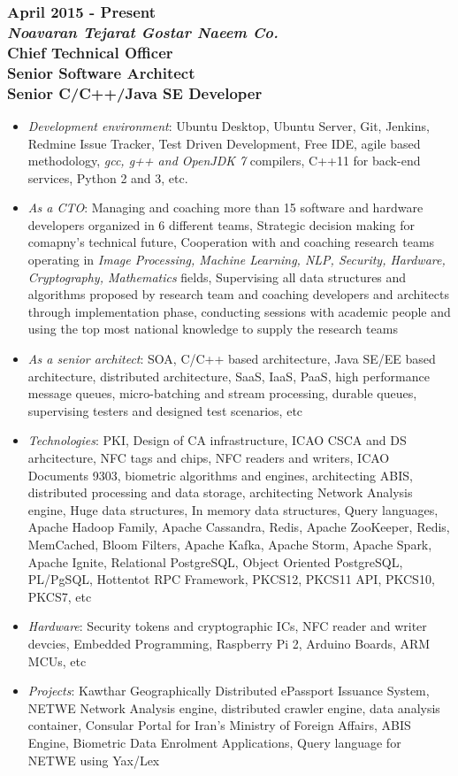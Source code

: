 \documentclass[10pt,a4paper]{article}
\begin{document}
\subsubsection{{April 2015 - Present} \\ \textnormal {\textit {Noavaran Tejarat Gostar Naeem Co.}} \\ {Chief Technical Officer \\ Senior Software Architect \\ Senior C/C++/Java SE Developer}}
  \setlength{\leftskip}{0.5cm}
  \setlength{\rightskip}{1cm}
  \begin{itemize}
    \setlength{\rightskip}{1cm}
    \setlength\itemsep{0em}
    \item \small \textit {Development environment}: Ubuntu Desktop, Ubuntu Server, Git, Jenkins, Redmine Issue Tracker, Test Driven Development, Free IDE, agile based methodology, \textit {gcc, g++ and OpenJDK 7} compilers, C++11 for back-end services, Python 2 and 3, etc.
    \item \small \textit {As a CTO}: Managing and coaching more than 15 software and hardware developers organized in 6 different teams, Strategic decision making for comapny's technical future, Cooperation with and coaching research teams operating in \textit {Image Processing, Machine Learning, NLP, Security, Hardware, Cryptography, Mathematics} fields, Supervising all data structures and algorithms proposed by research team and coaching developers and architects through implementation phase, conducting sessions with academic people and using the top most national knowledge to supply the research teams
    \item \small \textit {As a senior architect}: SOA, C/C++ based architecture, Java SE/EE based architecture, distributed architecture, SaaS, IaaS, PaaS, high performance message queues, micro-batching and stream processing, durable queues, supervising testers and designed test scenarios, etc
    \item \small \textit {Technologies}: PKI, Design of CA infrastructure, ICAO CSCA and DS arhcitecture, NFC tags and chips, NFC readers and writers, ICAO Documents 9303, biometric algorithms and engines, architecting ABIS, distributed processing and data storage, architecting Network Analysis engine, Huge data structures, In memory data structures, Query languages, Apache Hadoop Family, Apache Cassandra, Redis, Apache ZooKeeper, Redis, MemCached, Bloom Filters, Apache Kafka, Apache Storm, Apache Spark, Apache Ignite, Relational PostgreSQL, Object Oriented PostgreSQL, PL/PgSQL, Hottentot RPC Framework, PKCS12, PKCS11 API, PKCS10, PKCS7, etc
    \item \small \textit {Hardware}: Security tokens and cryptographic ICs, NFC reader and writer devcies, Embedded Programming, Raspberry Pi 2, Arduino Boards, ARM MCUs, etc
    \item \small \textit {Projects}: Kawthar Geographically Distributed ePassport Issuance System, NETWE Network Analysis engine, distributed crawler engine, data analysis container, Consular Portal for Iran's Ministry of Foreign Affairs, ABIS Engine, Biometric Data Enrolment Applications, Query language for NETWE using Yax/Lex
  \end{itemize}
\end{document}
